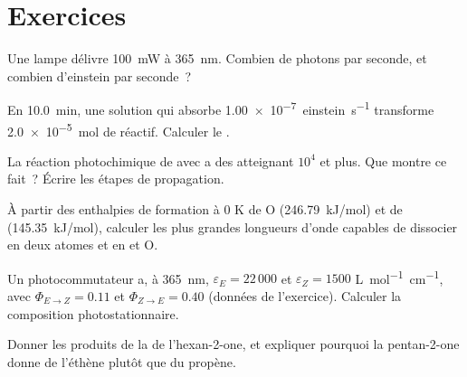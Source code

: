 \section{Exercices}

\begin{exercise}[$\star$]\label{exo:b3:photochemistry:1}
Une lampe délivre \qty{100}{mW} à \qty{365}{nm}. Combien de photons par
seconde, et combien d'einstein par seconde~?
\end{exercise}

\begin{exercise}[$\star$]\label{exo:b3:photochemistry:2}
En \qty{10.0}{min}, une solution qui absorbe \qty{1.00e-7}{einstein.s^{-1}}
transforme
\qty{2.0e-5}{mol} de réactif. Calculer le .
\end{exercise}

\begin{exercise}[$\star$]\label{exo:b3:photochemistry:3}
La réaction photochimique de  avec  a des  atteignant $10^4$ et plus. Que montre ce fait~? Écrire les
étapes de propagation.
\end{exercise}

\begin{exercise}[$\star$]\label{exo:b3:photochemistry:4}
À partir des enthalpies de formation à 0 K de O (\qty{246.79}{kJ/mol}) et
de 
(\qty{145.35}{kJ/mol}), calculer les plus grandes longueurs d'onde
capables de dissocier  en deux atomes et  en  et O.
\end{exercise}

\begin{exercise}[$\star\star$]\label{exo:b3:photochemistry:5}
Un photocommutateur a, à \qty{365}{nm}, $\varepsilon_E = 22\,000$ et
$\varepsilon_Z = 1500$ \unit{L.mol^{-1}.cm^{-1}}, avec
$\Phi_{E\to Z} = 0.11$ et $\Phi_{Z\to E} = 0.40$ (données de l'exercice).
Calculer la composition photostationnaire.
\end{exercise}

\begin{exercise}[$\star\star$]\label{exo:b3:photochemistry:6}
Donner les produits de la  de
l'hexan-2-one, et expliquer pourquoi la pentan-2-one donne de l'éthène
plutôt que du propène.
\end{exercise}


